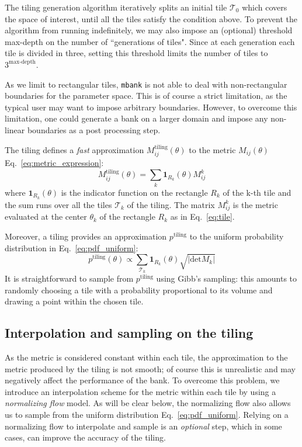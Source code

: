 \documentclass[twocolumn,showpacs,preprintnumbers,nofootinbib,prd,
superscriptaddress,10pt]{revtex4-2}
\begin{document}
The tiling generation algorithm iteratively splits an initial tile $\mathcal{T}_{0}$ which covers the space of interest, until all the tiles satisfy the condition above.
To prevent the algorithm from running indefinitely, we may also impose an (optional) threshold max-depth on the number of ``generations of tiles". Since at each generation each tile is divided in three, setting this threshold limits the number of tiles to $3^{\textrm{max-depth}}$.

As we limit to rectangular tiles, \texttt{mbank} is not able to deal with non-rectangular boundaries for the parameter space. This is of course a strict limitation, as the typical user may want to impose arbitrary boundaries. However, to overcome this limitation, one could generate a bank on a larger domain and impose any non-linear boundaries as a post processing step.

The tiling defines a {\it fast} approximation $M^{\text{tiling}}_{ij}(\theta)$ to the metric $M_{ij}(\theta)$ Eq.~\eqref{eq:metric_expression}:
\begin{equation}\label{eq:metric_tiling}
	M^\text{tiling}_{ij}(\theta) = \sum_{k} \mathbf{1}_{R_k}(\theta) M^{k}_{ij}
\end{equation}
where $\mathbf{1}_{R_k}(\theta)$ is the indicator function on the rectangle $R_k$ of the k-th tile and the sum runs over all the tiles $\mathcal{T}_k$ of the tiling. The matrix $M^{k}_{ij}$ is the metric evaluated at the center $\theta_k$ of the rectangle $R_k$ as in Eq.~\eqref{eq:tile}.

Moreover, a tiling provides an approximation $p^{\text{tiling}}$ to the uniform probability distribution in Eq.~\eqref{eq:pdf_uniform}:
\begin{equation}\label{eq:tiling_pdf}
	p^{\text{tiling}}(\theta) \propto \sum_{\mathcal{T}_k} \mathbf{1}_{R_k}(\theta) \sqrt{|\text{det} M_k|}
\end{equation}
It is straightforward to sample from $p^{\text{tiling}}$ using Gibb's sampling: this amounts to randomly choosing a tile with a probability proportional to its volume and drawing a point within the chosen tile.

\subsection{Interpolation and sampling on the tiling} \label{sec:normalizing_flow}

As the metric is considered constant within each tile, the approximation to the metric produced by the tiling is not smooth; of course this is unrealistic and may negatively affect the performance of the bank. To overcome this problem, we introduce an interpolation scheme for the metric within each tile by using a {\it normalizing flow} model. As will be clear below, the normalizing flow also allows us to sample from the uniform distribution Eq.~\eqref{eq:pdf_uniform}.
Relying on a normalizing flow to interpolate and sample is an {\it optional} step, which in some cases, can improve the accuracy of the tiling. 
\end{document}
